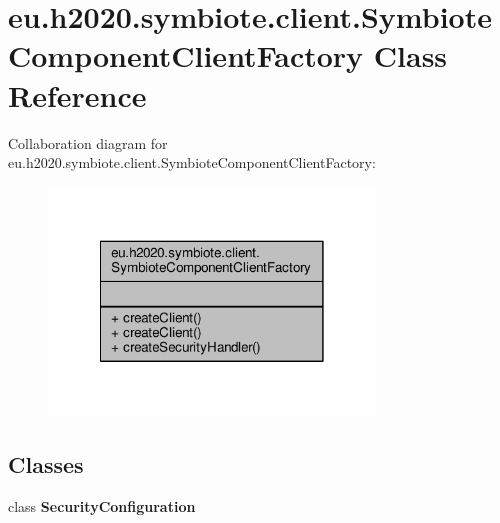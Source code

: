 \hypertarget{classeu_1_1h2020_1_1symbiote_1_1client_1_1SymbioteComponentClientFactory}{}\section{eu.\+h2020.\+symbiote.\+client.\+Symbiote\+Component\+Client\+Factory Class Reference}
\label{classeu_1_1h2020_1_1symbiote_1_1client_1_1SymbioteComponentClientFactory}


Collaboration diagram for eu.\+h2020.\+symbiote.\+client.\+Symbiote\+Component\+Client\+Factory\+:\nopagebreak
\begin{figure}[H]
\begin{center}
\leavevmode
\includegraphics[width=246pt]{classeu_1_1h2020_1_1symbiote_1_1client_1_1SymbioteComponentClientFactory__coll__graph}
\end{center}
\end{figure}
\subsection*{Classes}
\begin{DoxyCompactItemize}
\item 
class {\bfseries Security\+Configuration}
\end{DoxyCompactItemize}
